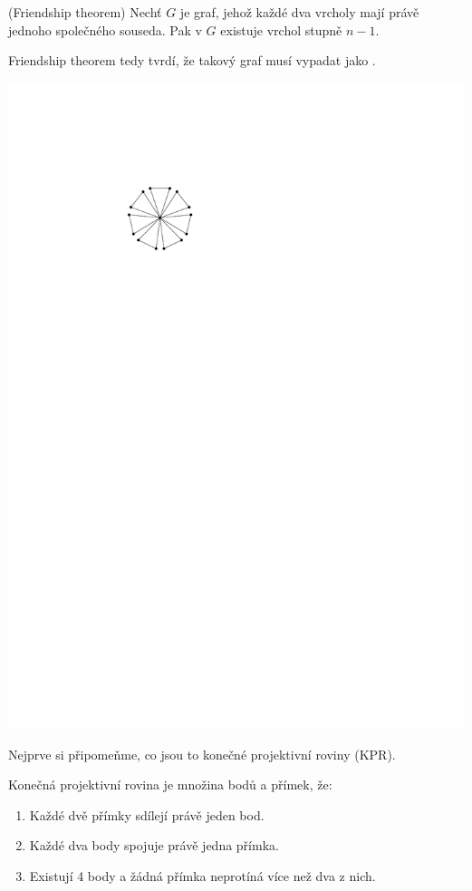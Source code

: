 \vt (Friendship theorem) Nechť $G$ je graf, jehož každé dva vrcholy mají právě jednoho společného souseda. Pak v $G$ existuje vrchol stupně $n-1$.

Friendship theorem tedy tvrdí, že takový graf musí vypadat jako .

\begin{center}
\includegraphics{friendship.pdf}
\end{center}

\dk Nejprve si připomeňme, co jsou to konečné projektivní roviny (KPR).

\df Konečná projektivní rovina je množina bodů a přímek, že:
\begin{enumerate}
	\item Každé dvě přímky sdílejí právě jeden bod.
	\item Každé dva body spojuje právě jedna přímka.
	\item Existují 4 body a žádná přímka neprotíná více než dva z nich.
\end{enumerate}

